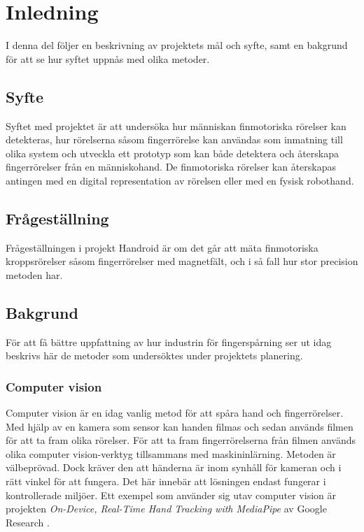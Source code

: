 \documentclass[a4paper]{article}
\begin{document}
\begin{sloppypar}

    \section{Inledning}
    I denna del följer en beskrivning av projektets mål och syfte, samt en bakgrund för att se hur syftet uppnås med olika metoder.
    \subsection{Syfte}
    Syftet med projektet är att undersöka hur människan finmotoriska rörelser kan detekteras, hur rörelserna såsom fingerrörelse kan användas som inmatning till olika system
    och utveckla ett prototyp som kan både detektera och återskapa fingerrörelser från en människohand.
    De finmotoriska rörelser kan återskapas antingen med en digital representation av rörelsen eller med en fysisk robothand.

    \subsection{Frågeställning}
    Frågeställningen i projekt Handroid är om det går att mäta finmotoriska kroppsrörelser såsom fingerrörelser med magnetfält, och i så fall hur stor precision metoden har.

    \subsection{Bakgrund}
    För att få bättre uppfattning av hur industrin för fingerspårning ser ut idag beskrivs här de metoder som undersöktes under projektets planering.

    \subsubsection{Computer vision}
    Computer vision är en idag vanlig metod för att spåra hand och fingerrörelser. Med hjälp av en kamera som sensor kan
    handen filmas och sedan används filmen för att ta fram olika rörelser. För att ta fram fingerrörelserna från
    filmen används olika computer vision-verktyg tillsammans med maskininlärning. Metoden är välbeprövad. Dock kräver den att
    händerna är inom synhåll för kameran och i rätt vinkel för att fungera. Det här innebär att lösningen endast fungerar
    i kontrollerade miljöer. Ett exempel som använder sig utav computer vision är projekten \textit{On-Device, Real-Time Hand Tracking with MediaPipe}
    av Google Research \cite{google:Hand_Tracking}.


\end{sloppypar}
\end{document}
